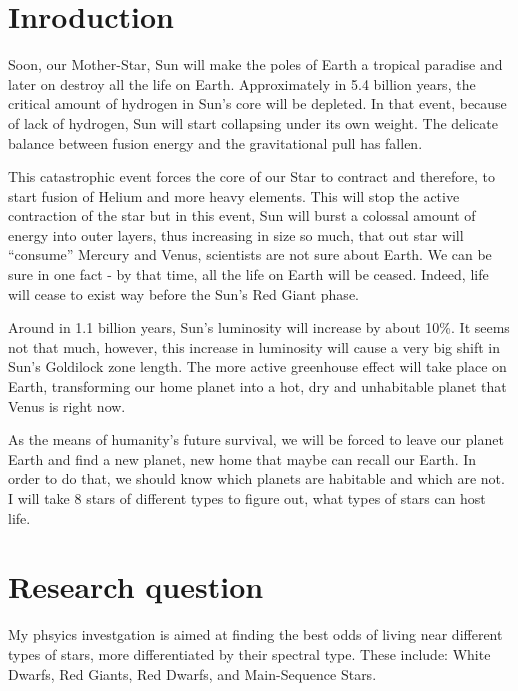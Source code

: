\documentclass{IEEEtran}
\begin{document}



\section{Inroduction}

Soon, our Mother-Star, Sun will make the poles of Earth a tropical paradise and later on destroy all the life on Earth. Approximately in 5.4 billion years, the critical amount of hydrogen in Sun's core will be depleted. In that event, because of lack of hydrogen, Sun will start collapsing under its own weight. The delicate balance between fusion energy and the gravitational pull has fallen.

This catastrophic event forces the core of our Star to contract and therefore, to start fusion of Helium and more heavy elements. This will stop the active contraction of the star but in this event, Sun will burst a colossal amount of energy into outer layers, thus increasing in size so much, that out star will ``consume'' Mercury and Venus, scientists are not sure about Earth. We can be sure in one fact -  by that time, all the life on Earth will be ceased. Indeed, life will cease to exist way before the Sun's Red Giant phase.

Around in 1.1 billion years, Sun's luminosity will increase by about 10\%. It seems not that much, however, this increase in luminosity will cause a very big shift in Sun's Goldilock zone length. The more active greenhouse effect will take place on Earth, transforming our home planet into a hot, dry and unhabitable planet that Venus is right now.~\cite{sun}

As the means of humanity's future survival, we will be forced to leave our planet Earth and find a new planet, new home that maybe can recall our Earth. In order to do that, we should know which planets are habitable and which are not. I will take 8 stars of different types to figure out, what types of stars can host life.

\section{Research question}

My phsyics investgation is aimed at finding the best odds of living near different types of stars, more differentiated by their spectral type. These include: White Dwarfs, Red Giants, Red Dwarfs, and Main-Sequence Stars.\\
\end{document}
